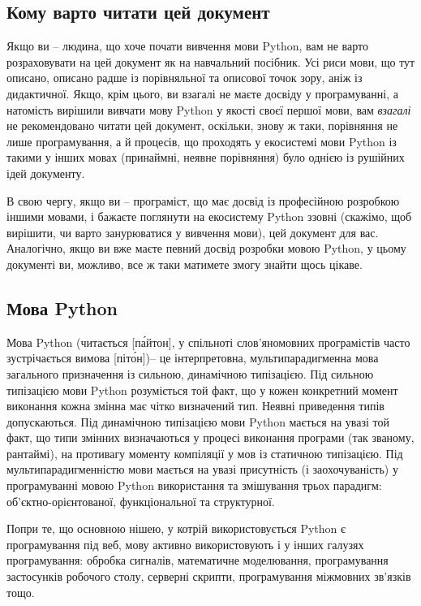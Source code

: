 \documentclass[a4paper, 12pt, onsedie]{article}
\begin{document}
\subsection{Кому варто читати цей документ}
Якщо ви -- людина, що хоче почати вивчення мови Python, вам не варто розраховувати на цей документ як
на навчальний посібник. Усі риси мови, що тут описано, описано радше із порівняльної та описової точок
зору, аніж із дидактичної. Якщо, крім цього, ви взагалі не маєте досвіду у програмуванні, а натомість
вирішили вивчати мову Python у якості своєї першої мови, вам \emph{взагалі} не рекомендовано читати цей
документ, оскільки, знову ж таки, порівняння не лише програмування, а й процесів, що проходять у екосистемі
мови Python із такими у інших мовах (принаймні, неявне порівняння) було однією із рушійних ідей документу.

В свою чергу, якщо ви -- програміст, що має досвід із професійною розробкою іншими мовами, і бажаєте
поглянути на екосистему Python ззовні (скажімо, щоб вирішити, чи варто занурюватися у вивчення мови),
цей документ для вас. Аналогічно, якщо ви вже маєте певний досвід розробки мовою Python, у цьому документі
ви, можливо, все ж таки матимете змогу знайти щось цікаве.

\subsection{Мова Python}

Мова Python (читається [п\'{а}йтон], у спільноті слов'яномовних програмістів 
часто зустрічається вимова [піт\'{о}н])-- 
це інтерпретовна, мультипарадигменна мова загального призначення із сильною,
динамічною типізацією. Під сильною типізацією мови Python розуміється той факт, що у кожен конкретний момент
виконання кожна змінна має чітко визначений тип. Неявні приведення типів допускаються. Під динамічною типізацією
мови Python мається на увазі той факт, що типи змінних визначаються у процесі виконання програми (так званому,
рантаймі), на противагу моменту компіляції у мов із статичною типізацією. Під мультипарадигменністю мови мається
на увазі присутність (і заохочуваність) у програмуванні мовою Python використання та змішування трьох парадигм:
об'єктно-орієнтованої, функціональної та структурної.

Попри те, що основною нішею, у котрій використовується Python є програмування під веб, мову активно використовують і
у інших галузях програмування: обробка сигналів, математичне моделювання, програмування застосунків робочого
столу, серверні скрипти, програмування міжмовних зв'язків тощо.
\end{document}
